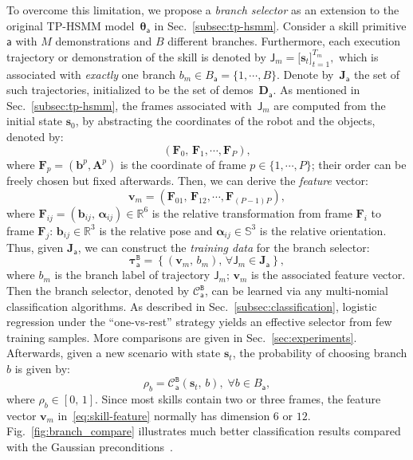 To overcome this limitation, 
we propose a \emph{branch selector} as an extension to the original TP-HSMM model~$\boldsymbol{\theta}_{\mathsf{a}}$ in Sec.~\ref{subsec:tp-hsmm}. 
Consider a skill primitive $\mathsf{a}$ with $M$ demonstrations and $B$ different branches. 
Furthermore, each execution trajectory or demonstration of the skill is denoted by 
$\mathsf{J}_m=\big[\mathbf{s}_t\big]_{t=1}^{T_m},$
which is associated with \emph{exactly} one branch $b_m\in B_{\mathsf{a}}=\{1,\cdots, B\}$. 
Denote by~$\boldsymbol{J}_{\mathsf{a}}$ the set of such trajectories,
initialized to be the set of demos~$\boldsymbol{D}_{\mathsf{a}}$.
As mentioned in Sec.~\ref{subsec:tp-hsmm}, 
the frames associated with~$\mathsf{J}_m$ are computed from the initial state $\mathbf{s}_0$, 
by abstracting the coordinates of the robot and the objects, denoted by:
\begin{equation}\label{eq:frames}
(\mathbf{F}_0,\,\mathbf{F}_1,\cdots,\mathbf{F}_P),
\end{equation}
where $\mathbf{F}_p=(\mathbf{b}^{p},\mathbf{A}^{p})$ is the coordinate of frame $p\in \{1,\cdots,P\}$;
their order can be freely chosen but fixed afterwards.
Then, we can derive the \emph{feature} vector:
\begin{equation}\label{eq:skill-feature}
\mathbf{v}_m = \left( \mathbf{F}_{01},\,\mathbf{F}_{12},\cdots,\mathbf{F}_{(P-1)P}\right),
\end{equation}
where $\mathbf{F}_{ij}=(\mathbf{b}_{ij},\,\boldsymbol{\alpha}_{ij})\in \mathbb{R}^6$ is the relative transformation from frame $\mathbf{F}_i$ to frame $\mathbf{F}_j$:
$\mathbf{b}_{ij}\in \mathbb{R}^3$ is the relative pose and $\boldsymbol{\alpha}_{ij}\in \mathbb{S}^3$ is the relative orientation.
Thus, given $\boldsymbol{J}_{\mathsf{a}}$, we can construct the \emph{training data} for the branch selector:
\begin{equation}\label{eq:branch-data}
\boldsymbol{\tau}_{\mathsf{a}}^{\texttt{B}}=\left\{ (\mathbf{v}_m,\,b_m),\,\forall \mathsf{J}_m\in \boldsymbol{J}_{\mathsf{a}}\right\},
\end{equation}
where $b_m$ is the branch label of trajectory $\mathsf{J}_m$;
$\mathbf{v}_m$ is the associated feature vector.
Then the branch selector, denoted by $\mathcal{C}_{\mathsf{a}}^{\texttt{B}}$, can be learned via any multi-nomial classification algorithms.
As described in Sec.~\ref{subsec:classification}, logistic regression under the ``one-vs-rest'' strategy yields an effective selector from few training samples.
More comparisons are given in Sec.~\ref{sec:experiments}.
Afterwards, given a new scenario with state $\mathbf{s}_t$,
the probability of choosing branch $b$ is given by:
\begin{equation}\label{eq:branch-prob}
\rho_{b} = \mathcal{C}_{\mathsf{a}}^{\texttt{B}}(\mathbf{s}_t,\, b), \;\forall b \in B_{\mathsf{a}},
\end{equation}
where $\rho_{b}\in [0,\,1]$.
Since most skills contain two or three frames, 
the feature vector $\mathbf{v}_m$ in~\eqref{eq:skill-feature} normally has dimension $6$ or $12$.
Fig.~\ref{fig:branch_compare} illustrates much better classification results compared with the Gaussian preconditions~\cite{rozo2020learning}.


